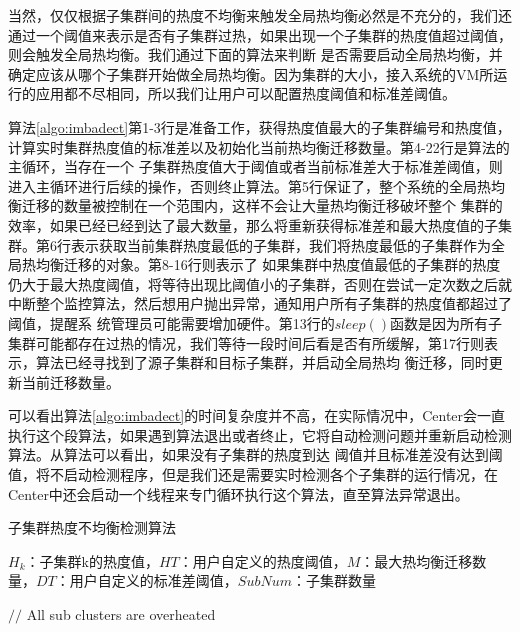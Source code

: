 当然，仅仅根据子集群间的热度不均衡来触发全局热均衡必然是不充分的，我们还通过一个阈值来表示是否有子集群过热，如果出现一个子集群的热度值超过阈值，则会触发全局热均衡。我们通过下面的算法来判断
是否需要启动全局热均衡，并确定应该从哪个子集群开始做全局热均衡。因为集群的大小，接入系统的VM所运行的应用都不尽相同，所以我们让用户可以配置热度阈值和标准差阈值。

算法\ref{algo:imbadect}第1-3行是准备工作，获得热度值最大的子集群编号和热度值，计算实时集群热度值的标准差以及初始化当前热均衡迁移数量。第4-22行是算法的主循环，当存在一个
子集群热度值大于阈值或者当前标准差大于标准差阈值，则进入主循环进行后续的操作，否则终止算法。第5行保证了，整个系统的全局热均衡迁移的数量被控制在一个范围内，这样不会让大量热均衡迁移破坏整个
集群的效率，如果已经已经到达了最大数量，那么将重新获得标准差和最大热度值的子集群。第6行表示获取当前集群热度最低的子集群，我们将热度最低的子集群作为全局热均衡迁移的对象。第8-16行则表示了
如果集群中热度值最低的子集群的热度仍大于最大热度阈值，将等待出现比阈值小的子集群，否则在尝试一定次数之后就中断整个监控算法，然后想用户抛出异常，通知用户所有子集群的热度值都超过了阈值，提醒系
统管理员可能需要增加硬件。第13行的$sleep()$函数是因为所有子集群可能都存在过热的情况，我们等待一段时间后看是否有所缓解，第17行则表示，算法已经寻找到了源子集群和目标子集群，并启动全局热均
衡迁移，同时更新当前迁移数量。

可以看出算法\ref{algo:imbadect}的时间复杂度并不高，在实际情况中，Center会一直执行这个段算法，如果遇到算法退出或者终止，它将自动检测问题并重新启动检测算法。从算法可以看出，如果没有子集群的热度到达
阈值并且标准差没有达到阈值，将不启动检测程序，但是我们还是需要实时检测各个子集群的运行情况，在Center中还会启动一个线程来专门循环执行这个算法，直至算法异常退出。

\begin{algorithm}
    \caption{子集群热度不均衡检测算法}
    \label{algo:imbadect}
    \begin{algorithmic}[1] %
    \Require $H_k$：子集群k的热度值，$HT$：用户自定义的热度阈值，$M$：最大热均衡迁移数量，$DT$：用户自定义的标准差阈值，$SubNum$：子集群数量
    
          \State $//$ All sub clusters are overheated
          \EndIf
        \EndWhile
      \EndIf
    \EndWhile
    \end{algorithmic}
\end{algorithm}

